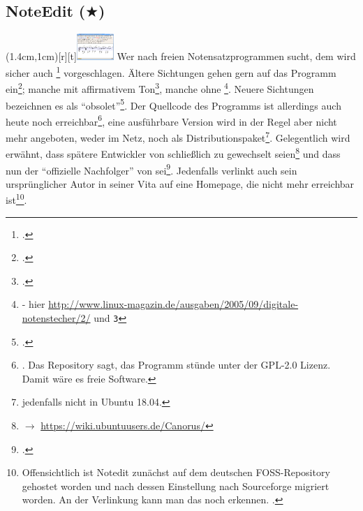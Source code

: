 %
%
%



\subsection{NoteEdit ($\bigstar$)}

\parpic(1.4cm,1cm)[r][t]{\includegraphics[width=1.4cm]{logos/noteedit-300dpi.png}}
\label{NoteEdit}Wer nach freien Notensatzprogrammen sucht, dem wird sicher auch
\footcite[vgl.][\nopage wp.]{Andres2002a} vorgeschlagen. Ältere
Sichtungen gehen gern auf das Programm ein\footcite[vgl.][\nopage
wp.]{Roitman2007a}; manche mit affirmativem Ton\footcite[vgl.][\nopage
wp.]{LinuxSoundNotation2006a}, manche ohne
\footnote{\cite[vgl.][\nopage wp.]{Brendel2005a} - hier
\href{http://www.linux-magazin.de/ausgaben/2005/09/digitale-notenstecher/2/}
{http://www.linux-magazin.de/ausgaben/2005/09/digitale-notenstecher/2/} und
\texttt{\/3\/}}. Neuere Sichtungen bezeichnen es als
\enquote{obsolet}\footcite[vgl.][\nopage wp.]{WpedNotensatz2019a}.
Der Quellcode des Programms ist allerdings auch heute noch
erreichbar\footnote{\cite[vgl.][\nopage wp.]{NoteeditRep2014a}. Das Repository sagt,
das Programm stünde unter der GPL-2.0 Lizenz. Damit wäre es freie Software.},
eine ausführbare Version wird in der Regel aber nicht mehr angeboten, weder im
Netz, noch als Distri\-bu\-tions\-paket\footnote{jedenfalls nicht in Ubuntu
18.04.}. Gelegentlich wird erwähnt, dass spätere Entwickler von 
schließlich zu  gewechselt seien\footnote{$\rightarrow$
\href{https://wiki.ubuntuusers.de/Canorus/}{https://wiki.ubuntuusers.de/Canorus/}
} und dass  nun der \enquote{offizielle Nachfolger} von
 sei\footcite[vgl.][\nopage wp.]{WpedCanorus2019a}.
Jedenfalls verlinkt auch sein ursprünglicher Autor  in seiner Vita
auf eine Homepage, die nicht mehr erreichbar ist\footnote{Offensichtlich ist
Notedit zunächst auf dem deutschen FOSS-Repository  gehostet worden
und nach dessen Einstellung nach Sourceforge migriert worden. An der Verlinkung
kann man das noch erkennen. \cite[vgl. dazu][\nopage wp.]{Andres2018a}.}.

